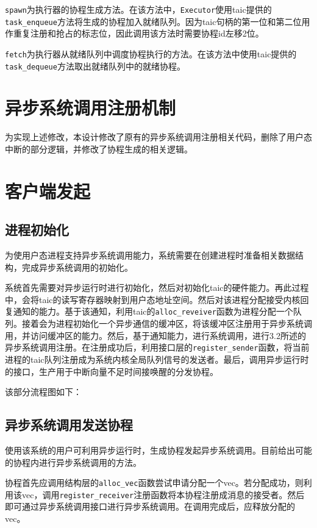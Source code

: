 \texttt{spawn}为执行器的协程生成方法。在该方法中，\texttt{Executor}使用taic提供的\texttt{task\_enqueue}方法将生成的协程加入就绪队列。因为taic句柄的第一位和第二位用作重复注册和抢占的标志位，因此调用该方法时需要协程id左移2位。

\texttt{fetch}为执行器从就绪队列中调度协程执行的方法。在该方法中使用taic提供的\texttt{task\_dequeue}方法取出就绪队列中的就绪协程。


\section{异步系统调用注册机制}

为实现上述修改，本设计修改了原有的异步系统调用注册相关代码，删除了用户态中断的部分逻辑，并修改了协程生成的相关逻辑。

\section{客户端发起}

\subsection{进程初始化}

为使用户态进程支持异步系统调用能力，系统需要在创建进程时准备相关数据结构，完成异步系统调用的初始化。

系统首先需要对异步运行时进行初始化，然后对初始化taic的硬件能力。再此过程中，会将taic的读写寄存器映射到用户态地址空间。然后对该进程分配接受内核回复通知的能力。基于该通知，利用taic的\texttt{alloc\_reveiver}函数为进程分配一个队列。接着会为进程初始化一个异步通信的缓冲区，将该缓冲区注册用于异步系统调用，并访问缓冲区的能力。然后，基于通知能力，进行系统调用，进行3.2所述的异步系统调用注册。在注册成功后，利用接口层的\texttt{register\_sender}函数，将当前进程的taic队列注册成为系统内核全局队列信号的发送者。最后，调用异步运行时的接口，生产用于中断向量不足时间接唤醒的分发协程。

该部分流程图如下：

\subsection{异步系统调用发送协程}

使用该系统的用户可利用异步运行时，生成协程发起异步系统调用。目前给出可能的协程内进行异步系统调用的方法。

协程首先应调用结构层的\texttt{alloc\_vec}函数尝试申请分配一个vec。若分配成功，则利用该vec，调用\texttt{register\_receiver}注册函数将本协程注册成消息的接受者。然后即可通过异步系统调用接口进行异步系统调用。在调用完成后，应释放分配的vec。
